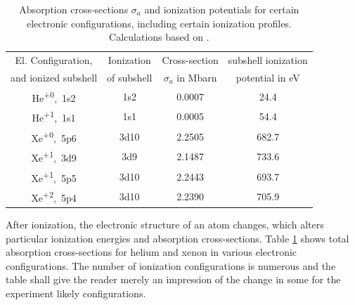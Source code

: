 \begin{table}
	\centering
		\begin{tabular}{ | c | c | c | c | }
		\hline
			El. Configuration, & Ionization & Cross-section  & subshell ionization  \\
			and ionized subshell & of subshell & $\sigma_{a}$ in Mbarn & potential in eV \\ \hline
			He\textsuperscript{+0},\ 1s2 & 1s2 & 0.0007 & 24.4 \\ \hline
			He\textsuperscript{+1},\ 1s1 & 1s1 & 0.0005 & 54.4 \\ \hline
			Xe\textsuperscript{+0},\ 5p6 & 3d10 & 2.2505 & 682.7 \\ \hline
			Xe\textsuperscript{+1},\ 3d9 & 3d9 & 2.1487 & 733.6 \\ \hline
			Xe\textsuperscript{+1},\ 5p5 & 3d10 & 2.2443 & 693.7 \\ \hline
			Xe\textsuperscript{+2},\ 5p4 & 3d10 & 2.2390 & 705.9 \\ \hline
		\end{tabular}
	\caption[Absorption cross-sections and ionization potentials for xenon and helium]{Absorption cross-sections $\sigma_{a}$ and ionization potentials for certain electronic configurations, including certain ionization profiles. Calculations based on \citep{Cowan-1981-Cal}.}
	\label{tab:helium-xenon-ionization}
\end{table}
After ionization, the electronic structure of an atom changes, which alters particular ionization energies and absorption cross-sections. Table \ref{tab:helium-xenon-ionization} shows total absorption cross-sections for helium and xenon in various electronic configurations. The number of ionization configurations is numerous and the table shall give the reader merely an impression of the change in some for the experiment likely configurations.\\[1\baselineskip]
%
%
%
